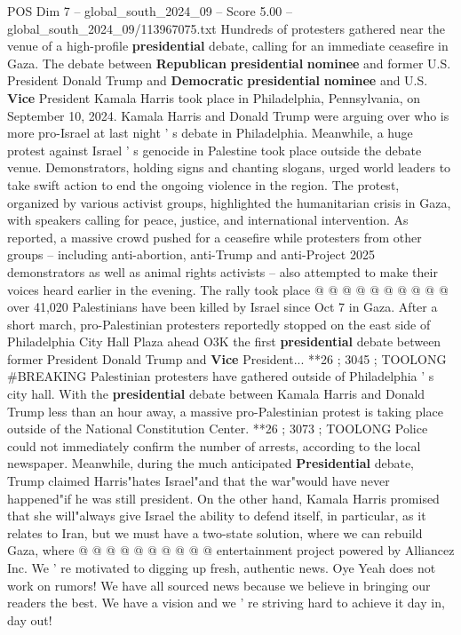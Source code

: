 \begin{textsample}{POS Dim 7 – global\_south\_2024\_09 – Score 5.00 – global\_south\_2024\_09/113967075.txt}  \label{ex:f7_pos_235}
Hundreds of protesters gathered near the venue of a high-profile \textbf{presidential} debate, calling for an immediate ceasefire in Gaza.
The debate between \textbf{Republican} \textbf{presidential} \textbf{nominee} and former U.S.
President Donald Trump and \textbf{Democratic} \textbf{presidential} \textbf{nominee} and U.S. \textbf{Vice} President Kamala Harris took place in Philadelphia, Pennsylvania, on September 10, 2024.
Kamala Harris and Donald Trump were arguing over who is more pro-Israel at last night ' s debate in Philadelphia.
Meanwhile, a huge protest against Israel ' s genocide in Palestine took place outside the debate venue.
Demonstrators, holding signs and chanting slogans, urged world leaders to take swift action to end the ongoing violence in the region.
The protest, organized by various activist groups, highlighted the humanitarian crisis in Gaza, with speakers calling for peace, justice, and international intervention.
As reported, a massive crowd pushed for a ceasefire while protesters from other groups -- including anti-abortion, anti-Trump and anti-Project 2025 demonstrators as well as animal rights activists -- also attempted to make their voices heard earlier in the evening.
The rally took place @ @ @ @ @ @ @ @ @ @ over 41,020 Palestinians have been killed by Israel since Oct 7 in Gaza.
After a short march, pro-Palestinian protesters reportedly stopped on the east side of Philadelphia City Hall Plaza ahead O3K the first \textbf{presidential} debate between former President Donald Trump and \textbf{Vice} President... **26 ; 3045 ; TOOLONG \#BREAKING Palestinian protesters have gathered outside of Philadelphia ' s city hall.
With the \textbf{presidential} debate between Kamala Harris and Donald Trump less than an hour away, a massive pro-Palestinian protest is taking place outside of the National Constitution Center. **26 ; 3073 ; TOOLONG Police could not immediately confirm the number of arrests, according to the local newspaper.
Meanwhile, during the much anticipated \textbf{Presidential} debate, Trump claimed Harris"hates Israel"and that the war"would have never happened"if he was still president.
On the other hand, Kamala Harris promised that she will"always give Israel the ability to defend itself, in particular, as it relates to Iran, but we must have a two-state solution, where we can rebuild Gaza, where @ @ @ @ @ @ @ @ @ @ entertainment project powered by Alliancez Inc.
We ' re motivated to digging up fresh, authentic news.
Oye Yeah does not work on rumors!
We have all sourced news because we believe in bringing our readers the best.
We have a vision and we ' re striving hard to achieve it day in, day out!

\end{textsample}
